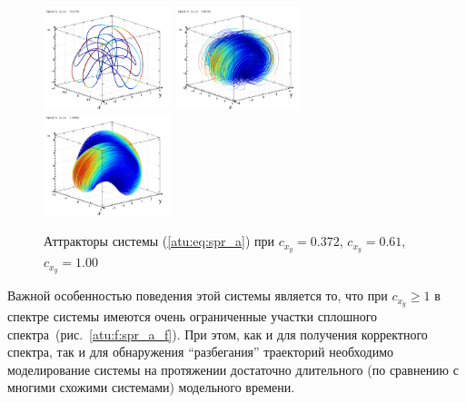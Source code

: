 \begin{figure}[htb!]
\centerline{
  \includegraphics[width=0.33\textwidth]{p/cha/spr_a/sprott_a-p_xyz_cx_y=0x372.png}
  \includegraphics[width=0.33\textwidth]{p/cha/spr_a/sprott_a-p_xyz_cx_y=0x610.png}
  \includegraphics[width=0.33\textwidth]{p/cha/spr_a/sprott_a-p_xyz_cx_y=1x000.png}
}
\caption{Аттракторы системы (\ref{atu:eq:spr_a})
  при $ c_{x_y} =0.372 $, $ c_{x_y} =0.61 $, $ c_{x_y} =1.00 $
}
\label{atu:f:spr_a_phase}
\end{figure}

Важной особенностью поведения этой системы является то, что при $ c_{x_y} \ge 1 $
в спектре системы имеются очень ограниченные участки сплошного спектра~(рис.~\ref{atu:f:spr_a_f}).
При этом, как и для получения корректного спектра, так и для обнаружения ``разбегания'' траекторий
необходимо моделирование системы на протяжении достаточно длительного
(по сравнению с многими схожими системами) модельного времени.

